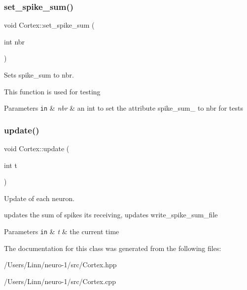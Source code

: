 \subsubsection{\texorpdfstring{set\+\_\+spike\+\_\+sum()}{set\_spike\_sum()}}
{\footnotesize\ttfamily void Cortex\+::set\+\_\+spike\+\_\+sum (\begin{DoxyParamCaption}\item[{int}]{nbr }\end{DoxyParamCaption})\hspace{0.3cm}{\ttfamily [static]}}



Sets spike\+\_\+sum to nbr. 

This function is used for testing 
\begin{DoxyParams}[1]{Parameters}
\mbox{\tt in}  & {\em nbr} & an int to set the attribute spike\+\_\+sum\+\_\+ to nbr for tests \\
\hline
\end{DoxyParams}
\hypertarget{class_cortex_a9c30099b98098f2dd3b9d2aa215ca619}{}\label{class_cortex_a9c30099b98098f2dd3b9d2aa215ca619} 
\subsubsection{\texorpdfstring{update()}{update()}}
{\footnotesize\ttfamily void Cortex\+::update (\begin{DoxyParamCaption}\item[{int}]{t }\end{DoxyParamCaption})\hspace{0.3cm}{\ttfamily [static]}}



Update of each neuron. 

updates the sum of spikes it\textquotesingle{}s receiving, updates write\+\_\+spike\+\_\+sum\+\_\+file 
\begin{DoxyParams}[1]{Parameters}
\mbox{\tt in}  & {\em t} & the current time \\
\hline
\end{DoxyParams}


The documentation for this class was generated from the following files\+:\begin{DoxyCompactItemize}
\item 
/\+Users/\+Linn/neuro-\/1/src/Cortex.\+hpp\item 
/\+Users/\+Linn/neuro-\/1/src/Cortex.\+cpp\end{DoxyCompactItemize}
